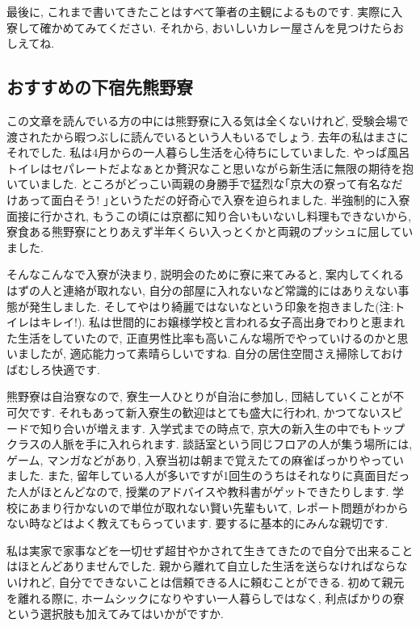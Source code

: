 \documentclass[10pt,b5jsbook,dvips,dvipdfmx,openany]{jsbook}
\theoremstyle{definition}
\begin{document}
		最後に, これまで書いてきたことはすべて筆者の主観によるものです. 実際に入寮して確かめてみてください. それから, おいしいカレー屋さんを見つけたらおしえてね. 


		\subsection{おすすめの下宿先熊野寮} 

		この文章を読んでいる方の中には熊野寮に入る気は全くないけれど, 受験会場で渡されたから暇つぶしに読んでいるという人もいるでしょう. 去年の私はまさにそれでした. 私は4月からの一人暮らし生活を心待ちにしていました. やっぱ風呂トイレはセパレートだよなぁとか贅沢なこと思いながら新生活に無限の期待を抱いていました. ところがどっこい両親の身勝手で猛烈な｢京大の寮って有名なだけあって面白そう! ｣というただの好奇心で入寮を迫られました. 半強制的に入寮面接に行かされ, もうこの頃には京都に知り合いもいないし料理もできないから, 寮食ある熊野寮にとりあえず半年くらい入っとくかと両親のプッシュに屈していました. 

		そんなこんなで入寮が決まり, 説明会のために寮に来てみると, 案内してくれるはずの人と連絡が取れない, 自分の部屋に入れないなど常識的にはありえない事態が発生しました. そしてやはり綺麗ではないなという印象を抱きました(注:トイレはキレイ!). 私は世間的にお嬢様学校と言われる女子高出身でわりと恵まれた生活をしていたので, 正直男性比率も高いこんな場所でやっていけるのかと思いましたが, 適応能力って素晴らしいですね. 自分の居住空間さえ掃除しておけばむしろ快適です. 

		熊野寮は自治寮なので, 寮生一人ひとりが自治に参加し, 団結していくことが不可欠です. それもあって新入寮生の歓迎はとても盛大に行われ, かつてないスピードで知り合いが増えます. 入学式までの時点で, 京大の新入生の中でもトップクラスの人脈を手に入れられます. 談話室という同じフロアの人が集う場所には, ゲーム, マンガなどがあり, 入寮当初は朝まで覚えたての麻雀ばっかりやっていました. また, 留年している人が多いですが1回生のうちはそれなりに真面目だった人がほとんどなので, 授業のアドバイスや教科書がゲットできたりします. 学校にあまり行かないので単位が取れない賢い先輩もいて, レポート問題がわからない時などはよく教えてもらっています. 要するに基本的にみんな親切です. 

		私は実家で家事などを一切せず超甘やかされて生きてきたので自分で出来ることはほとんどありませんでした. 親から離れて自立した生活を送らなければならないけれど, 自分でできないことは信頼できる人に頼むことができる. 初めて親元を離れる際に, ホームシックになりやすい一人暮らしではなく, 利点ばかりの寮という選択肢も加えてみてはいかがですか. 
\end{document}
